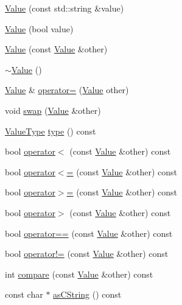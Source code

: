 \begin{DoxyCompactItemize}
\hyperlink{class_json_1_1_value_aa4501dd4edf3ce3d5145fc656f088b21}{Value} (const std\-::string \&value)
\item 
\hyperlink{class_json_1_1_value_a350a31ea4a30d384994b0bc010b17495}{Value} (bool value)
\item 
\hyperlink{class_json_1_1_value_a436dfd3670f95fd665f680eba5cebcf0}{Value} (const \hyperlink{class_json_1_1_value}{Value} \&other)
\item 
\hyperlink{class_json_1_1_value_a287dea48da3912d02756735bf677b27b}{$\sim$\-Value} ()
\item 
\hyperlink{class_json_1_1_value}{Value} \& \hyperlink{class_json_1_1_value_a795acb28772da4c5d85ae8f4af36c69f}{operator=} (\hyperlink{class_json_1_1_value}{Value} other)
\item 
void \hyperlink{class_json_1_1_value_aab841120d78e296e1bc06a373345e822}{swap} (\hyperlink{class_json_1_1_value}{Value} \&other)
\item 
\hyperlink{namespace_json_a7d654b75c16a57007925868e38212b4e}{Value\-Type} \hyperlink{class_json_1_1_value_a695ef31fad36b4712918b3ff80158479}{type} () const 
\item 
bool \hyperlink{class_json_1_1_value_af0ad8aa027575c3277296458f3fb7b0a}{operator$<$} (const \hyperlink{class_json_1_1_value}{Value} \&other) const 
\item 
bool \hyperlink{class_json_1_1_value_afb99dd3628fe44244b32007f9b4f369a}{operator$<$=} (const \hyperlink{class_json_1_1_value}{Value} \&other) const 
\item 
bool \hyperlink{class_json_1_1_value_acc13fc47d55abd6e2327b090b83d2911}{operator$>$=} (const \hyperlink{class_json_1_1_value}{Value} \&other) const 
\item 
bool \hyperlink{class_json_1_1_value_a3124a26067bdfde9571bc89527fc6931}{operator$>$} (const \hyperlink{class_json_1_1_value}{Value} \&other) const 
\item 
bool \hyperlink{class_json_1_1_value_a14363dda23a6ae2def9afd1590ae85d3}{operator==} (const \hyperlink{class_json_1_1_value}{Value} \&other) const 
\item 
bool \hyperlink{class_json_1_1_value_ad0f12d2a4ab74bbef08a05504b2cb81d}{operator!=} (const \hyperlink{class_json_1_1_value}{Value} \&other) const 
\item 
int \hyperlink{class_json_1_1_value_a899214ed2253d3f4f061b922b0e622b5}{compare} (const \hyperlink{class_json_1_1_value}{Value} \&other) const 
\item 
const char $\ast$ \hyperlink{class_json_1_1_value_a5b7da48b163bcec63b1424f1608b7da6}{as\-C\-String} () const 

\end{DoxyCompactItemize}
